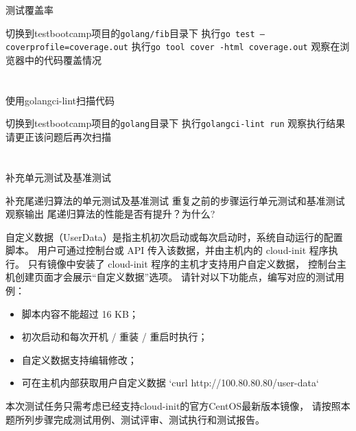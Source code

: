 \documentclass[12pt,addpoints,fleqn]{exam}
\begin{document}
\begin{questions}
\begin{parts}
  \part{}测试覆盖率
  \begin{subparts}
    \subpart{}切换到testbootcamp项目的\verb=golang/fib=目录下
    \subpart{}执行\verb#go test –coverprofile=coverage.out#
    \subpart{}执行\verb#go tool cover -html coverage.out#
    \subpart{}观察在浏览器中的代码覆盖情况
  \end{subparts}

  \part{}使用golangci-lint扫描代码
  \begin{subparts}
    \subpart{}切换到testbootcamp项目的\verb=golang=目录下
    \subpart{}执行\verb#golangci-lint run#
    \subpart{}观察执行结果 
    \subpart{}请更正该问题后再次扫描
  \end{subparts}


  \part{}补充单元测试及基准测试
  \begin{subparts}
    \subpart{}补充尾递归算法的单元测试及基准测试
    \subpart{}重复之前的步骤运行单元测试和基准测试
    \subpart{}观察输出
    \subpart{}尾递归算法的性能是否有提升？为什么?
  \end{subparts}

\end{parts}

\newpage
\question[40] 
自定义数据（UserData）是指主机初次启动或每次启动时，系统自动运行的配置脚本。
用户可通过控制台或 API 传入该数据，并由主机内的 cloud-init 程序执行。
只有镜像中安装了 cloud-init 程序的主机才支持用户自定义数据，
控制台主机创建页面才会展示“自定义数据”选项。
请针对以下功能点，编写对应的测试用例：

\begin{itemize}
  \item 脚本内容不能超过 16 KB；
  \item 初次启动和每次开机 / 重装 / 重启时执行；
  \item 自定义数据支持编辑修改；
  \item 可在主机内部获取用户自定义数据 `curl http://100.80.80.80/user-data`
\end{itemize}
本次测试任务只需考虑已经支持cloud-init的官方CentOS最新版本镜像，
请按照本题所列步骤完成测试用例、测试评审、测试执行和测试报告。


\end{questions}
\end{document}
